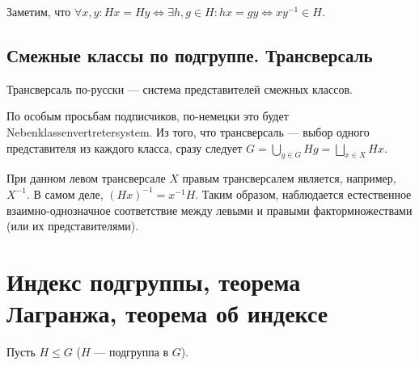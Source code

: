 \documentclass[a4paper]{report}
\begin{document}
    Заметим, что $\forall x, y: Hx = Hy \iff \exists h, g \in H: hx = gy \iff xy^{-1} \in H$.

    \subsection{Смежные классы по подгруппе. Трансверсаль}
    Трансверсаль по-русски --- система представителей смежных классов.

    По особым просьбам подписчиков, по-немецки это будет Nebenklassenvertretersystem.
    Из того, что трансверсаль --- выбор одного представителя из каждого класса, сразу следует
    $G = \bigcup\limits_{g \in G}Hg = \bigsqcup\limits_{x \in X}Hx$.

    При данном левом трансверсале $X$ правым трансверсалем является, например, $X^{-1}$.
    В самом деле, $(Hx)^{-1} = x^{-1}H$.
    Таким образом, наблюдается естественное взаимно-однозначное соответствие между левыми и правыми фактормножествами (или их представителями).


    \section{Индекс подгруппы, теорема Лагранжа, теорема об индексе}
    Пусть $H \le G$ ($H$ --- подгруппа в $G$).
\end{document}
